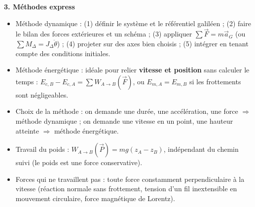 \documentclass[11pt]{article}
\newcommand{\cle}[1]{{\popxbold\color{popdark}#1}}
\begin{document}
\begin{aretenir}
\textbf{3. Méthodes express}
\begin{itemize}
  \item \cle{Méthode dynamique} : (1) définir le système et le référentiel galiléen ; (2) faire le bilan des forces extérieures et un schéma ; (3) appliquer $\sum\vec{F}=m\vec{a}_G$ (ou $\sum M_\Delta=J_\Delta\ddot{\theta}$) ; (4) projeter sur des axes bien choisis ; (5) intégrer en tenant compte des conditions initiales.
  \item \cle{Méthode énergétique} : idéale pour relier \textbf{vitesse et position} sans calculer le temps : $E_{c,B}-E_{c,A}=\sum W_{A\to B}(\vec{F})$, ou $E_{m,A}=E_{m,B}$ si les frottements sont négligeables.
  \item \cle{Choix de la méthode} : on demande une durée, une accélération, une force $\Rightarrow$ méthode dynamique ; on demande une vitesse en un point, une hauteur atteinte $\Rightarrow$ méthode énergétique.
  \item \cle{Travail du poids} : $W_{A\to B}(\vec{P})=mg(z_A-z_B)$, indépendant du chemin suivi (le poids est une force conservative).
  \item \cle{Forces qui ne travaillent pas} : toute force constamment perpendiculaire à la vitesse (réaction normale sans frottement, tension d'un fil inextensible en mouvement circulaire, force magnétique de Lorentz).
\end{itemize}
\end{aretenir}
\end{document}
